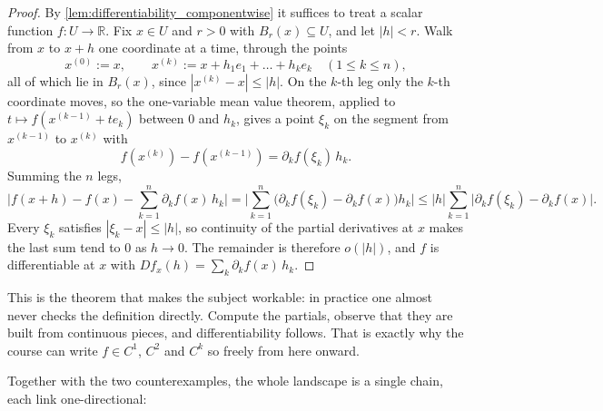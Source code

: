 \begin{proof}
By \cref{lem:differentiability_componentwise} it suffices to treat a scalar function
$f : U \to \mathbb{R}$. Fix $x \in U$ and $r > 0$ with $B_r(x) \subseteq U$, and let $|h| < r$.
Walk from $x$ to $x+h$ one coordinate at a time, through the points
\[x^{(0)} := x, \qquad x^{(k)} := x + h_1e_1 + \dots + h_ke_k \quad (1 \leq k \leq n),\]
all of which lie in $B_r(x)$, since $|x^{(k)} - x| \leq |h|$. On the $k$-th leg only the $k$-th
coordinate moves, so the one-variable mean value theorem, applied to
$t \mapsto f(x^{(k-1)} + te_k)$ between $0$ and $h_k$, gives a point $\xi_k$ on the segment from
$x^{(k-1)}$ to $x^{(k)}$ with
\[f(x^{(k)}) - f(x^{(k-1)}) = \partial_kf(\xi_k)\,h_k.\]
Summing the $n$ legs,
\[\Big|f(x+h) - f(x) - \sum_{k=1}^n \partial_kf(x)\,h_k\Big|
  = \Big|\sum_{k=1}^n \big(\partial_kf(\xi_k) - \partial_kf(x)\big)h_k\Big|
  \leq |h|\sum_{k=1}^n \big|\partial_kf(\xi_k) - \partial_kf(x)\big|.\]
Every $\xi_k$ satisfies $|\xi_k - x| \leq |h|$, so continuity of the partial derivatives at $x$
makes the last sum tend to $0$ as $h \to 0$. The remainder is therefore $o(|h|)$, and $f$ is
differentiable at $x$ with $Df_x(h) = \sum_k \partial_kf(x)\,h_k$.
\end{proof}

This is the theorem that makes the subject workable: in practice one almost never checks the
definition directly. Compute the partials, observe that they are built from continuous pieces,
and differentiability follows. That is exactly why the course can write $f \in C^1$, $C^2$ and
$C^k$ so freely from here onward.

Together with the two counterexamples, the whole landscape is a single chain, each link
one-directional:

